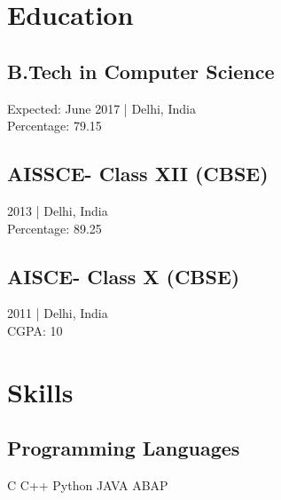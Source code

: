 \documentclass[]{resume-openfont}
\begin{document}
%
%



%
%

\begin{minipage}[t]{0.33\textwidth} 


\section{Education} 

\subsection{B.Tech in Computer Science}
Expected: June 2017 | Delhi, India \\ Percentage: 79.15
\sectionsep

\subsection{AISSCE- Class XII (CBSE)}
2013 | Delhi, India \\ Percentage: 89.25
\sectionsep

\subsection{AISCE- Class X (CBSE)}
2011 | Delhi, India \\ CGPA: 10
\sectionsep


\section{Skills}
\subsection{Programming Languages}
C \textbullet{} C++ \textbullet{} Python \textbullet{} JAVA \textbullet{} ABAP
\sectionsep

\end{minipage}
\end{document}
